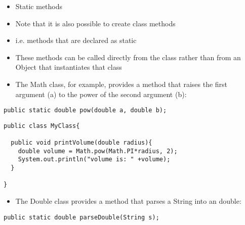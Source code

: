 \documentclass{beamer}
\begin{document}
\begin{frame}
\begin{itemize}
\item Static methods
\bigskip
\item Note that it is also possible to create class methods
\item i.e. methods that are declared as static
\item These methods can be called directly from the class rather than from an Object that instantiates that class
\end{itemize} 
\end{frame}


\begin{frame}[fragile]
\begin{itemize}
\item The Math class, for example, provides a method that raises the first argument (a) to the power of the second argument (b):
\end{itemize} 
\begin{block}{}
\begin{lstlisting}
public static double pow(double a, double b);
\end{lstlisting}
\end{block}
\end{frame} 

\begin{frame}[fragile]
\begin{block}{}
\begin{lstlisting}
public class MyClass{

  public void printVolume(double radius){
    double volume = Math.pow(Math.PI*radius, 2);
    System.out.println("volume is: " +volume);
  } 
  
}
\end{lstlisting}
\end{block}
\end{frame}

\begin{frame}[fragile]
\begin{itemize}
\item The Double class provides a method that parses a String into an double:
\end{itemize} 
\begin{block}{}
\begin{lstlisting}
public static double parseDouble(String s);
\end{lstlisting}
\end{block}
\end{frame} 
\end{document}
